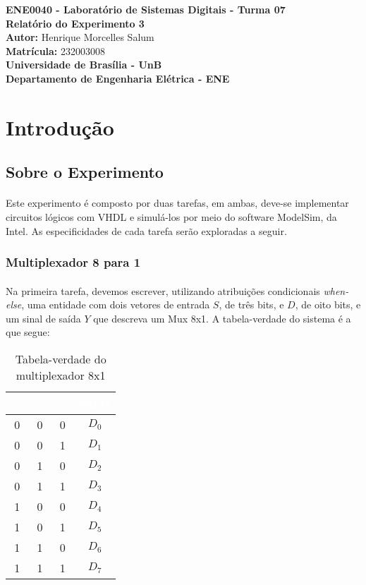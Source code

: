 \documentclass[a4paper,12pt]{article}
\newcommand{\capa}{
    \begin{titlepage}
        \begin{center}
            {\large \textbf{ENE0040 - Laboratório de Sistemas Digitais - Turma 07}} \\
            \vspace{3cm}
            {\Huge \textbf{Relatório do Experimento 3}} \\[1em]
            {\large \textbf{Autor:} Henrique Morcelles Salum} \\[0.5em]
            {\large \textbf{Matrícula:} 232003008} \\
            \vfill
            {\Large \textbf{Universidade de Brasília - UnB}} \\[0.75em]
            {\large \textbf{Departamento de Engenharia Elétrica - ENE}} \\
        \end{center}
    \end{titlepage}
}
\begin{document}
\capa

\newpage
\tableofcontents
\newpage

\section{Introdução}

\subsection{Sobre o Experimento}
\paragraph{}
Este experimento é composto por duas tarefas, em ambas, deve-se implementar circuitos lógicos com VHDL e simulá-los por meio do software ModelSim, da Intel. As especificidades de cada tarefa serão exploradas a seguir.

\subsubsection{Multiplexador 8 para 1}
\paragraph{}
Na primeira tarefa, devemos escrever, utilizando atribuições condicionais \textit{when-else}, uma entidade com dois vetores de entrada $S$, de três bits, e $D$, de oito bits, e um sinal de saída $Y$ que descreva um Mux 8x1. A tabela-verdade do sistema é a que segue:

\begin{table}[H]
    \footnotesize
    \centering
    \begin{tabular}{|c|c|c|c|}
        \hline
        \rowcolor{black}
        \textcolor{white}{$S_2$} & \textcolor{white}{$S_1$} & \textcolor{white}{$S_0$} & \textcolor{white}{Saída} \\ \hline
        0 & 0 & 0 & $D_0$ \\ \hline
        \rowcolor{cinza}
        0 & 0 & 1 & $D_1$ \\ \hline
        0 & 1 & 0 & $D_2$ \\ \hline
        \rowcolor{cinza}
        0 & 1 & 1 & $D_3$ \\ \hline
        1 & 0 & 0 & $D_4$ \\ \hline
        \rowcolor{cinza}
        1 & 0 & 1 & $D_5$ \\ \hline
        1 & 1 & 0 & $D_6$ \\ \hline
        \rowcolor{cinza}
        1 & 1 & 1 & $D_7$ \\ \hline
    \end{tabular}
    \caption{Tabela-verdade do multiplexador 8x1}
    \vspace{-5pt}
\end{table}
\end{document}
